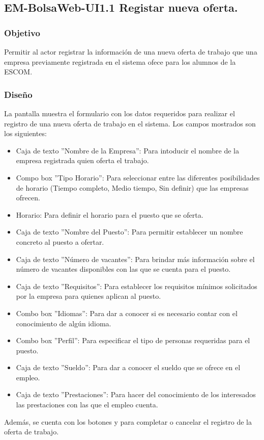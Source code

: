 
	
\subsection{EM-BolsaWeb-UI1.1 Registar nueva oferta.}

\subsubsection{Objetivo}
	\noindent
	Permitir al actor registrar la información de una nueva oferta de trabajo que una empresa previamente registrada en el sistema ofece para los alumnos de la ESCOM. 

\subsubsection{Diseño}
	\noindent
	La pantalla muestra el formulario con los datos requeridos para realizar el registro de una nueva oferta de trabajo en el sistema.
	Los campos mostrados son los siguientes: 
	\begin{itemize}
		\item Caja de texto ''Nombre de la Empresa'': Para intoducir el nombre de la empresa registrada quien oferta el trabajo.
		\item Compo box ''Tipo Horario'': Para seleccionar entre las diferentes posibilidades de horario (Tiempo completo, Medio tiempo, Sin definir) que las empresas ofrecen.
		\item Horario: Para definir el horario para el puesto que se oferta.
		\item Caja de texto ''Nombre del Puesto'': Para permitir establecer un nombre concreto al puesto a ofertar.
		\item Caja de texto ''Número de vacantes'': Para brindar más información sobre el número de vacantes disponibles con las que se cuenta para el puesto.
		\item Caja de texto ''Requisitos'': Para establecer los requisitos mínimos solicitados por la empresa para quienes aplican al puesto.
		\item Combo box ''Idiomas'': Para dar a conocer si es necesario contar con el conocimiento de algún idioma.
		\item Combo box ''Perfil'': Para especificar el tipo de personas requeridas para el puesto.
		\item Caja de texto ''Sueldo'': Para dar a conocer el sueldo que se ofrece en el empleo.
		\item Caja de texto ''Prestaciones'': Para hacer del conocimiento de los interesados las prestaciones con las que el empleo cuenta.
	\end{itemize}
	Además, se cuenta con los botones  y  para completar o cancelar el registro de la oferta de trabajo.

